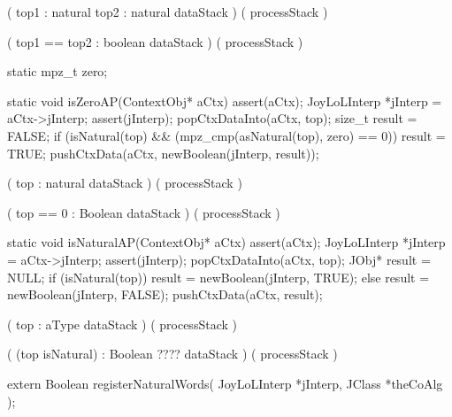 \starttyping

\startWord[equal]

\preDataStack
  (
    top1 : natural
    top2 : natural
    dataStack
  )
\preProcessStack
  ( processStack )
\preConditions
\stopPreConditions

\postDataStack
  (
    top1 == top2 : boolean
    dataStack
  )
\postProcessStack
  ( processStack )
\postConditions
\stopPostConditions

\stopWord

\stoptyping

\startCCode
static  mpz_t zero;

static void isZeroAP(ContextObj* aCtx) {
  assert(aCtx);
  JoyLoLInterp *jInterp = aCtx->jInterp;
  assert(jInterp);
  popCtxDataInto(aCtx, top);
  size_t result = FALSE;
  if (isNatural(top) &&
      (mpz_cmp(asNatural(top), zero) == 0)) result = TRUE;
  pushCtxData(aCtx, newBoolean(jInterp, result));
}
\stopCCode

\starttyping

\startWord[isZero]

\preDataStack
  (
    top : natural
    dataStack
  )
\preProcessStack
  ( processStack )
\preConditions
\stopPreConditions

\postDataStack
  (
    top == 0 : Boolean
    dataStack
  )
\postProcessStack
  ( processStack )
\postConditions
\stopPostConditions

\stopWord

\stoptyping

\startCCode
static void isNaturalAP(ContextObj* aCtx) {
  assert(aCtx);
  JoyLoLInterp *jInterp = aCtx->jInterp;
  assert(jInterp);
  popCtxDataInto(aCtx, top);
  JObj* result = NULL;
  if (isNatural(top))
    result = newBoolean(jInterp, TRUE);
  else
    result = newBoolean(jInterp, FALSE);
  pushCtxData(aCtx, result);
}
\stopCCode

\starttyping

\startWord[isNatural]

\preDataStack
  (
    top : aType
    dataStack
  )
\preProcessStack
  ( processStack )
\preConditions
\stopPreConditions

\postDataStack
  ( 
    (top isNatural) : Boolean ????
    dataStack
  )
\postProcessStack
  ( processStack )
\postConditions
\stopPostConditions

\stopWord

\stoptyping

\startCHeader
extern Boolean registerNaturalWords(
  JoyLoLInterp *jInterp,
  JClass       *theCoAlg
);
\stopCHeader
{}

